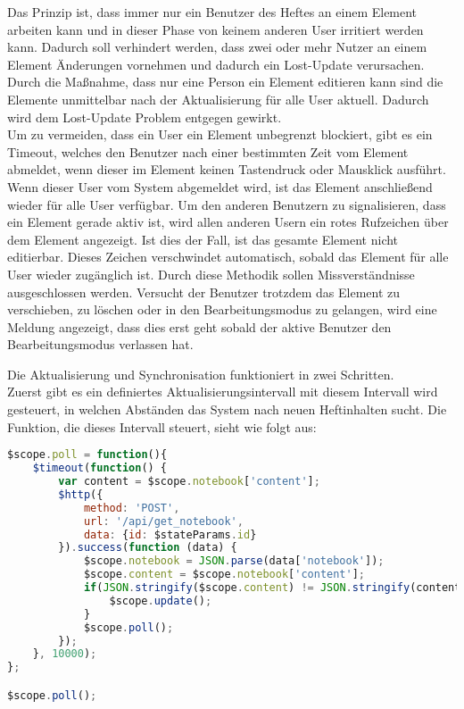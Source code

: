 Das Prinzip ist, dass immer nur ein Benutzer des Heftes an einem Element arbeiten kann und in dieser Phase von keinem anderen User irritiert werden kann. Dadurch soll verhindert werden, dass zwei oder mehr Nutzer an einem Element Änderungen vornehmen und dadurch ein Lost-Update verursachen. Durch die Maßnahme, dass nur eine Person ein Element editieren kann sind die Elemente unmittelbar nach der Aktualisierung für alle User aktuell. Dadurch wird dem Lost-Update Problem entgegen gewirkt.\cite{DATENBANKSYSTEME}\\
Um zu vermeiden, dass ein User ein Element unbegrenzt blockiert, gibt es ein Timeout, welches den Benutzer nach einer bestimmten Zeit vom Element abmeldet, wenn dieser im Element keinen Tastendruck oder Mausklick ausführt. Wenn dieser User vom System abgemeldet wird, ist das Element anschließend wieder für alle User verfügbar.
\newpage
Um den anderen Benutzern zu signalisieren, dass ein Element gerade aktiv ist, wird allen anderen Usern ein rotes Rufzeichen über dem Element angezeigt. Ist dies der Fall, ist das gesamte Element nicht editierbar. 
Dieses Zeichen verschwindet automatisch, sobald das Element für alle User wieder zugänglich ist. Durch diese Methodik sollen Missverständnisse ausgeschlossen werden. Versucht der Benutzer trotzdem das Element zu verschieben, zu löschen oder in den Bearbeitungsmodus zu gelangen, wird eine Meldung angezeigt, dass dies erst geht sobald der aktive Benutzer den Bearbeitungsmodus verlassen hat. 

Die Aktualisierung und Synchronisation funktioniert in zwei Schritten.\\
Zuerst gibt es ein definiertes Aktualisierungsintervall mit diesem Intervall wird gesteuert, in welchen Abständen das System nach neuen Heftinhalten sucht. Die Funktion, die dieses Intervall steuert, sieht wie folgt aus:
\begin{lstlisting}[caption={Aktualisierung - PWS}, language=Javascript]
$scope.poll = function(){
    $timeout(function() {
        var content = $scope.notebook['content'];
        $http({
            method: 'POST',
            url: '/api/get_notebook',
            data: {id: $stateParams.id}
        }).success(function (data) {
            $scope.notebook = JSON.parse(data['notebook']);
            $scope.content = $scope.notebook['content'];
            if(JSON.stringify($scope.content) != JSON.stringify(content)) {
                $scope.update();
            }
            $scope.poll();
        });
    }, 10000);
};

$scope.poll();
\end{lstlisting}

